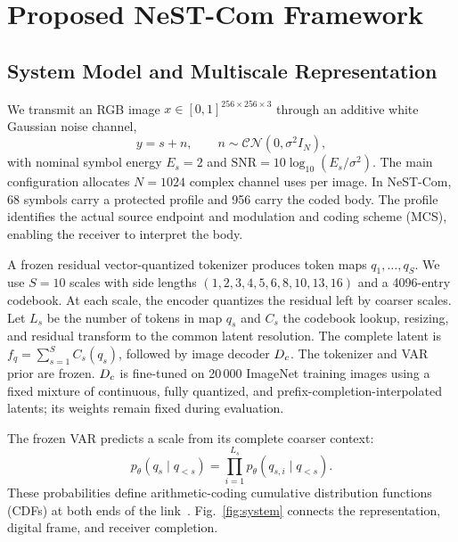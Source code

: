 \section{Proposed NeST-Com Framework}
\subsection{System Model and Multiscale Representation}
We transmit an RGB image $x\in[0,1]^{256\times256\times3}$ through an additive white Gaussian noise channel,
\begin{equation}
 y=s+n,\qquad n\sim\mathcal{CN}(0,\sigma^2 I_N),
 \label{eq:channel}
\end{equation}
with nominal symbol energy $E_s=2$ and $\mathrm{SNR}=10\log_{10}(E_s/\sigma^2)$. The main configuration allocates $N=1024$ complex channel uses per image. In NeST-Com, 68 symbols carry a protected profile and 956 carry the coded body. The profile identifies the actual source endpoint and modulation and coding scheme (MCS), enabling the receiver to interpret the body.

A frozen residual vector-quantized tokenizer produces token maps $q_1,\ldots,q_S$. We use $S=10$ scales with side lengths $(1,2,3,4,5,6,8,10,13,16)$ and a 4096-entry codebook. At each scale, the encoder quantizes the residual left by coarser scales. Let $L_s$ be the number of tokens in map $q_s$ and $C_s$ the codebook lookup, resizing, and residual transform to the common latent resolution. The complete latent is $f_q=\sum_{s=1}^S C_s(q_s)$, followed by image decoder $D_c$. The tokenizer and VAR prior are frozen. $D_c$ is fine-tuned on 20\,000 ImageNet training images using a fixed mixture of continuous, fully quantized, and prefix-completion-interpolated latents; its weights remain fixed during evaluation.

The frozen VAR predicts a scale from its complete coarser context:
\begin{equation}
 p_\theta(q_s\mid q_{<s})=\prod_{i=1}^{L_s}p_\theta(q_{s,i}\mid q_{<s}).
 \label{eq:prior}
\end{equation}
These probabilities define arithmetic-coding cumulative distribution functions (CDFs) at both ends of the link~\cite{arithmetic}. Fig.~\ref{fig:system} connects the representation, digital frame, and receiver completion.

